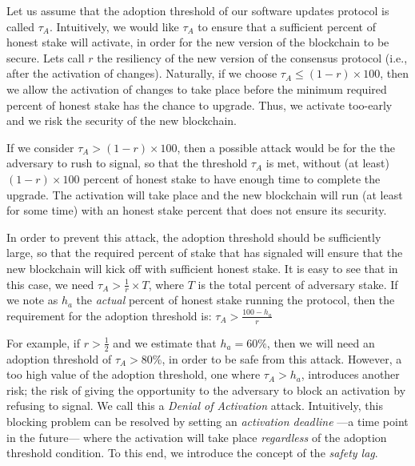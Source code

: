Let us assume that the adoption threshold of our software updates protocol is called $\tau_A$. %
 Intuitively, we would like $\tau_A$ to ensure that a sufficient percent of honest stake will activate, in order for the new version of the blockchain to be secure. Lets call $r$ the resiliency
 of the new version of the consensus protocol (i.e., after the activation of changes). Naturally, if we choose $\tau_A \leq (1-r)\times100$, then we allow the activation of changes to take place before the minimum required percent of honest stake has the chance to upgrade. Thus, we activate too-early and we risk the security of the new blockchain. 

If we consider $\tau_A > (1-r)\times100$, then a possible attack would be for the the adversary to rush to signal, so that the threshold $\tau_A$ is met, without (at least) $(1-r) \times 100$ percent of honest stake to have enough time to complete the upgrade. The activation will take place and the new blockchain will run (at least for some time) with an honest stake percent that does not ensure its security. 

In order to prevent this attack, the adoption threshold should be sufficiently large, so that the required percent of stake that has signaled will ensure that the new blockchain will kick off with sufficient honest stake. It is easy to see that in this case, we need $\tau_A > \frac{1}{r} \times T$, where $T$ is the total percent of adversary stake. If we note as $h_a$ the \emph{actual} percent of honest stake running the protocol, then the requirement for the adoption threshold is:
$\tau_A > \frac{100 - h_a}{r}$

For example, if $r > \frac{1}{2}$ and we estimate that $h_a = 60\%$, then we will need an adoption threshold of $\tau_A > 80\% $, in order to be safe from this attack. However, a too high value of the adoption threshold, one where $\tau_A > h_a$, introduces another risk; the risk of  giving the opportunity to the adversary to block an activation by refusing to signal. We call this a \emph{Denial of Activation} attack. Intuitively, this blocking problem can be resolved by setting an \emph{activation deadline} ---a time point in the future--- where the activation will take place \emph{regardless} of the adoption threshold condition. To this end, we introduce the concept of the \emph{safety lag}.

